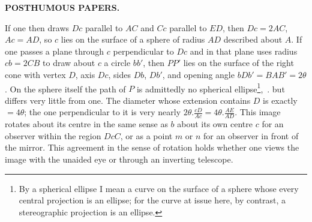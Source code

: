 \clearpage
\noindent{}\hfill{\small\textbf{POSTHUMOUS PAPERS.}}\hfill\null\par
\begin{center}
\end{center}
If one then draws $Dc$ parallel to $AC$ and $Cc$ parallel to $ED$, then $Dc=2AC$,
$Ac=AD$, so $c$ lies on the surface of a sphere of radius $AD$ described about
$A$. If one passes a plane through $c$ perpendicular to $Dc$ and in that plane
uses radius $cb=2CB$ to draw about $c$ a circle $bb'$, then $PP'$ lies on the
surface of the right cone with vertex $D$, axis $Dc$, sides $Db$, $Db'$, and
opening angle $bDb'=BAB'=2\theta$. On the sphere itself the path of $P$ is
admittedly no spherical ellipse\begingroup\renewcommand{\thefootnote}{*)}\footnote{By a spherical ellipse I mean a curve on the surface of a sphere whose every central projection is an ellipse; for the curve at issue here, by contrast, a stereographic projection is an ellipse.}\endgroup,\ .
but differs very little from one. The diameter whose extension contains $D$
is exactly $=4\theta$; the one perpendicular to it is very nearly
$2\theta.\frac{cD}{Ac}=4\theta.\frac{AE}{AD}$. This image rotates about its
centre in the same sense as $b$ about its own centre $c$ for an observer within
the region $DcC$, or as a point $m$ or $n$ for an observer in front of the
mirror. This agreement in the sense of rotation holds whether one views the
image with the unaided eye or through an inverting telescope.

